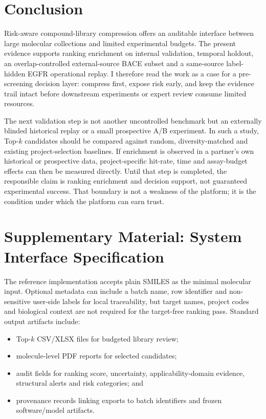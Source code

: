 \documentclass[manuscript=article]{achemso}
\begin{document}
\section{Conclusion}
Risk-aware compound-library compression offers an auditable interface between
large molecular collections and limited experimental budgets. The present
evidence supports ranking enrichment on internal validation, temporal holdout,
an overlap-controlled external-source BACE subset and a same-source
label-hidden EGFR operational replay. I therefore read the work as a case for
a pre-screening decision layer: compress first, expose risk early, and keep the
evidence trail intact before downstream experiments or expert review consume
limited resources.

The next validation step is not another uncontrolled benchmark but an
externally blinded historical replay or a small prospective A/B experiment.
In such a study, Top-$k$ candidates should be compared against random,
diversity-matched and existing project-selection baselines. If enrichment is
observed in a partner's own historical or prospective data, project-specific
hit-rate, time and assay-budget effects can then be measured directly. Until
that step is completed, the responsible claim is ranking enrichment and
decision support, not guaranteed experimental success. That boundary is not a
weakness of the platform; it is the condition under which the platform can
earn trust.

\appendix
\section{Supplementary Material: System Interface Specification}
The reference implementation accepts plain SMILES as the minimal molecular
input. Optional metadata can include a batch name, row identifier and
non-sensitive user-side labels for local traceability, but target names,
project codes and biological context are not required for the target-free
ranking pass. Standard output artifacts include:
\begin{itemize}
  \item Top-$k$ CSV/XLSX files for budgeted library review;
  \item molecule-level PDF reports for selected candidates;
  \item audit fields for ranking score, uncertainty, applicability-domain
        evidence, structural alerts and risk categories; and
  \item provenance records linking exports to batch identifiers and frozen
        software/model artifacts.
\end{itemize}
\end{document}
